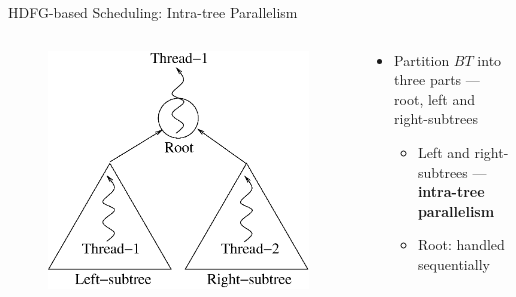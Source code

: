 \documentclass{beamer}
\begin{document}
\begin{CJK}{UTF8}{bkai}
            \begin{frame}{HDFG-based Scheduling: Intra-tree Parallelism}
                \begin{columns}
                    \begin{column}{0.45\textwidth}
                        \begin{figure}[!ht] 
                            \centering
                            \includegraphics[width=1.0\textwidth]{./figs/partition}
                            \label{fig:archi}
                        \end{figure}
                    \end{column}
                    \begin{column}{0.6\textwidth}
                        \begin{itemize}
                            \pause
                            \item {Partition $BT$ into three parts --- root, left and right-subtrees
                                \begin{itemize}
                                    \item Left and right-subtrees --- \textbf{intra-tree parallelism}
                                    \item Root: handled sequentially
                                \end{itemize}
                            }
                        \pause

\end{itemize}
\end{column}
\end{columns}
\end{frame}
\end{CJK}
\end{document}
